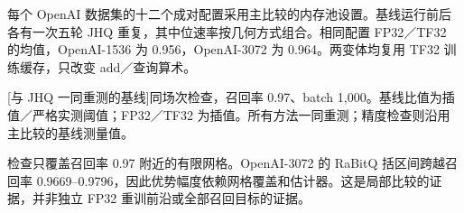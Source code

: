 每个 OpenAI 数据集的十二个成对配置采用主比较的内存池设置。基线运行前后各有一次五轮 JHQ 重复，其中位速率按几何方式组合。相同配置 FP32／TF32 的均值，OpenAI-1536 为 0.956，OpenAI-3072 为 0.964。两变体均复用 TF32 训练缓存，只改变 add／查询算术。

\par\medskip\noindent\begin{minipage}{\linewidth}
\captionsetup{hypcap=false}
\centering
{}[与 JHQ 一同重测的基线]{同场次检查，召回率 0.97、batch 1,000。基线比值为插值／严格实测阈值；FP32／TF32 为插值。所有方法一同重测；精度检查则沿用主比较的基线测量值。}
\label{tab:b-precision-anchors}
\footnotesize\setlength{\tabcolsep}{3pt}

\end{minipage}\par\medskip

检查只覆盖召回率 0.97 附近的有限网格。OpenAI-3072 的 RaBitQ 括区间跨越召回率 0.9669--0.9796，因此优势幅度依赖网格覆盖和估计器。这是局部比较的证据，并非独立 FP32 重训前沿或全部召回目标的证据。
